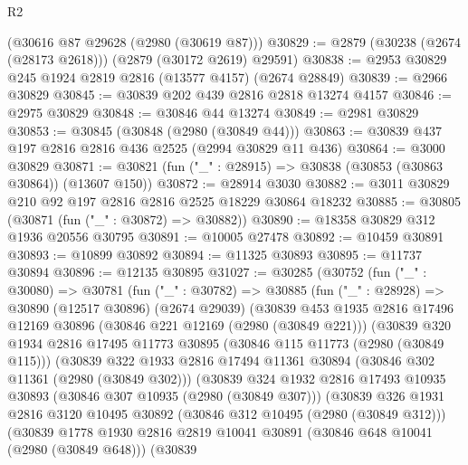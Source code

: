 \begin{lexlean}{R2}
\begin{coremodule}
    (@30616 @87 @29628 (@2980 (@30619 @87)))
@30829 := @2879 (@30238 (@2674 (@28173 @2618))) (@2879 (@30172 @2619) @29591)
@30838 := @2953 @30829 @245 @1924 @2819 @2816 (@13577 @4157) (@2674 @28849)
@30839 := @2966 @30829
@30845 := @30839 @202 @439 @2816 @2818 @13274 @4157
@30846 := @2975 @30829
@30848 := @30846 @44 @13274
@30849 := @2981 @30829
@30853 := @30845 (@30848 (@2980 (@30849 @44)))
@30863 := @30839 @437 @197 @2816 @2816 @436 @2525 (@2994 @30829 @11 @436)
@30864 := @3000 @30829
@30871 := @30821 (fun ("_" : @28915) => @30838 (@30853 (@30863 @30864)) (@13607 @150))
@30872 := @28914 @3030
@30882 := @3011 @30829 @210 @92 @197 @2816 @2816 @2525 @18229 @30864 @18232
@30885 := @30805 (@30871 (fun ("_" : @30872) => @30882))
@30890 := @18358 @30829 @312 @1936 @20556 @30795
@30891 := @10005 @27478
@30892 := @10459 @30891
@30893 := @10899 @30892
@30894 := @11325 @30893
@30895 := @11737 @30894
@30896 := @12135 @30895
@31027 := @30285
    (@30752
      (fun ("_" : @30080) =>
      @30781
        (fun ("_" : @30782) =>
        @30885
          (fun ("_" : @28928) =>
          @30890
            (@12517 @30896)
            (@2674 @29039)
            (@30839
              @453
              @1935
              @2816
              @17496
              @12169
              @30896
              (@30846 @221 @12169 (@2980 (@30849 @221)))
              (@30839
                @320
                @1934
                @2816
                @17495
                @11773
                @30895
                (@30846 @115 @11773 (@2980 (@30849 @115)))
                (@30839
                  @322
                  @1933
                  @2816
                  @17494
                  @11361
                  @30894
                  (@30846 @302 @11361 (@2980 (@30849 @302)))
                  (@30839
                    @324
                    @1932
                    @2816
                    @17493
                    @10935
                    @30893
                    (@30846 @307 @10935 (@2980 (@30849 @307)))
                    (@30839
                      @326
                      @1931
                      @2816
                      @3120
                      @10495
                      @30892
                      (@30846 @312 @10495 (@2980 (@30849 @312)))
                      (@30839
                        @1778
                        @1930
                        @2816
                        @2819
                        @10041
                        @30891
                        (@30846 @648 @10041 (@2980 (@30849 @648)))
                        (@30839

\end{coremodule}
\end{lexlean}
